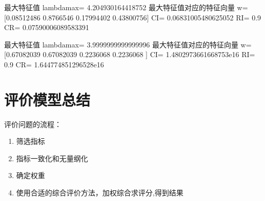 \documentclass[letterpaper,10pt,english]{sphinxmanual}
\begin{document}
\begin{sphinxVerbatim}[commandchars=\\\{\}]
最大特征值 lambda\PYGZus{}max= 4.204930164418752
最大特征值对应的特征向量 w= [0.08512486 0.8766546  0.17994402 0.43800756]
CI= 0.06831005480625052
RI= 0.9
CR= 0.07590006089583391
\end{sphinxVerbatim}

\begin{sphinxVerbatim}[commandchars=\\\{\}]
  \PYG{p}{[}\PYG{p}{[}\PYG{p}{]}
             \PYG{p}{[}\PYG{p}{]}
             \PYG{p}{[}   \PYG{p}{]}
              \PYG{p}{[}\PYG{p}{]}\PYG{p}{]}     
  
\end{sphinxVerbatim}

\begin{sphinxVerbatim}[commandchars=\\\{\}]
最大特征值 lambda\PYGZus{}max= 3.9999999999999996
最大特征值对应的特征向量 w= [0.67082039 0.67082039 0.2236068  0.2236068 ]
CI= \PYGZhy{}1.4802973661668753e\PYGZhy{}16
RI= 0.9
CR= \PYGZhy{}1.644774851296528e\PYGZhy{}16
\end{sphinxVerbatim}



\section{评价模型总结}
\label{\detokenize{docs/evaluation_model:id23}}
评价问题的流程：
\begin{enumerate}
%
\item {} 
筛选指标

\item {} 
指标一致化和无量纲化

\item {} 
确定权重

\item {} 
使用合适的综合评价方法，加权综合求评分,得到结果

\end{enumerate}
\end{document}
